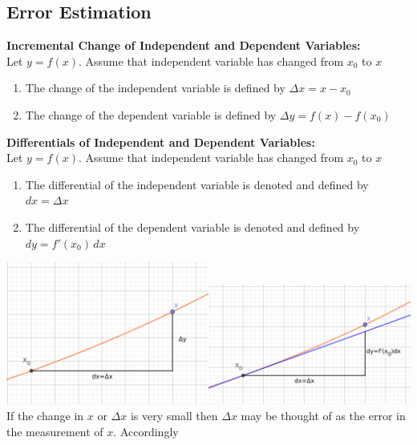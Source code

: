 \documentclass[14pt]{article}
\begin{document}
    \subsection{Error Estimation} 
    \textbf{Incremental Change of Independent and Dependent
    Variables:}\\
    Let $y=f(x)$. Assume that independent variable has changed from
    $x_0$ to $x$
    \begin{enumerate}
        \item The change of the independent variable is defined by
        $\Delta x=x-x_0$
        \item The change of the dependent variable is defined by $\Delta
        y=f(x)-f(x_0)$
    \end{enumerate}
    \textbf{Differentials of Independent and Dependent Variables:}\\
    Let $y=f(x)$. Assume that independent variable has changed from
    $x_0$ to $x$
    \begin{enumerate}
        \item The differential of the independent variable is denoted
        and defined by $dx=\Delta x$
        \item The differential of the dependent variable is denoted and
        defined by $dy=f'(x_0)\, dx$
    \end{enumerate}
    \includegraphics[width=0.5\textwidth]{differentials.png}\includegraphics[width=0.5\textwidth]{differentials2.png}\\
    If the change in $x$ or $\Delta x$ is very small then $\Delta x$ may
    be thought of as the error in the measurement of $x$. Accordingly
\end{document}
